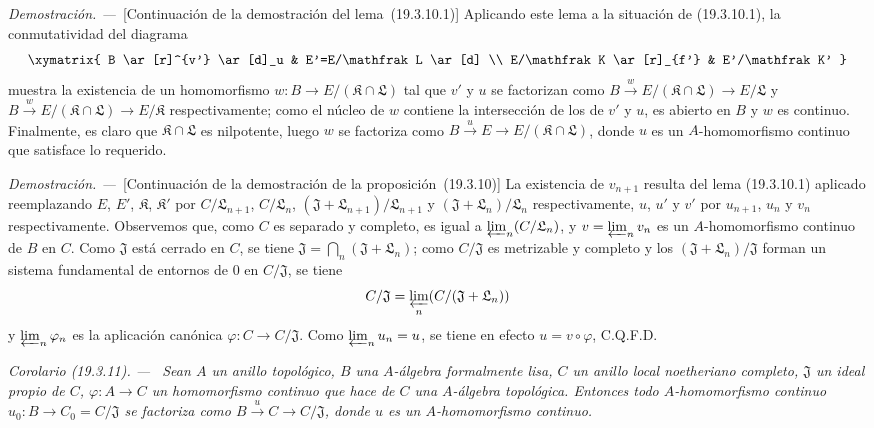 \documentclass[10pt,oneside]{book}
\makeatletter
\newcommand{\setmanualcurrentlabel}[1]{\def\@currentlabel{#1}}
\newenvironment{corollary}[1][]{%
  \setmanualcurrentlabel{#1}\par\medskip\noindent\itshape Corolario (#1). ---\ }{\par}
\newenvironment{proof}{%
  \par\medskip\noindent\textit{Demostración. ---\ }}{\par}
\makeatother
\begin{document}
\begin{proof}[Continuación de la demostración del lema~{\rm(19.3.10.1)}]
Aplicando este lema a la situación de (19.3.10.1), la conmutatividad del
diagrama
\[
\xymatrix{
  B \ar[r]^{v'} \ar[d]_u & E'=E/\mathfrak L \ar[d] \\
  E/\mathfrak K \ar[r]_{f'} & E'/\mathfrak K'
}
\]
muestra la existencia de un homomorfismo
$w:B\to E/(\mathfrak K\cap\mathfrak L)$ tal que $v'$ y $u$ se
factorizan como
$B\xrightarrow{w}E/(\mathfrak K\cap\mathfrak L)\to E/\mathfrak L$
y
$B\xrightarrow{w}E/(\mathfrak K\cap\mathfrak L)\to E/\mathfrak K$
respectivamente; como el núcleo de $w$ contiene la intersección de los de
$v'$ y $u$, es abierto en $B$ y $w$ es continuo. Finalmente, es claro
que $\mathfrak K\cap\mathfrak L$ es nilpotente, luego $w$ se factoriza como
$B\xrightarrow{u}E\to E/(\mathfrak K\cap\mathfrak L)$, donde $u$ es
un $A$-homomorfismo continuo que satisface lo requerido.
\end{proof}

\begin{proof}[Continuación de la demostración de la proposición~{\rm(19.3.10)}]
La existencia de $v_{n+1}$ resulta del lema (19.3.10.1) aplicado reemplazando
$E$, $E'$, $\mathfrak K$, $\mathfrak K'$ por
$C/\mathfrak L_{n+1}$, $C/\mathfrak L_n$,
$(\mathfrak J+\mathfrak L_{n+1})/\mathfrak L_{n+1}$ y
$(\mathfrak J+\mathfrak L_n)/\mathfrak L_n$ respectivamente, $u$, $u'$
y $v'$ por $u_{n+1}$, $u_n$ y $v_n$ respectivamente. Observemos que, como $C$
es separado y completo, es igual a $\varprojlim_n(C/\mathfrak L_n)$, y
$v=\varprojlim_n v_n$ es un $A$-homomorfismo continuo de $B$ en $C$.
Como $\mathfrak J$ está cerrado en $C$, se tiene
$\mathfrak J=\bigcap_n(\mathfrak J+\mathfrak L_n)$; como
$C/\mathfrak J$ es metrizable y completo y los
$(\mathfrak J+\mathfrak L_n)/\mathfrak J$ forman un sistema fundamental
de entornos de $0$ en $C/\mathfrak J$, se tiene
\[
  C/\mathfrak J=\varprojlim_n(C/(\mathfrak J+\mathfrak L_n))
\]
y $\varprojlim_n\varphi_n$ es la aplicación canónica
$\varphi:C\to C/\mathfrak J$. Como $\varprojlim_n u_n=u$, se tiene en efecto
$u=v\circ\varphi$, C.Q.F.D.
\end{proof}

\begin{corollary}[19.3.11]
\label{0.19.3.11-es}
Sean $A$ un anillo topológico, $B$ una $A$-álgebra formalmente lisa,
$C$ un anillo local noetheriano completo, $\mathfrak J$ un ideal propio de
$C$, $\varphi:A\to C$ un homomorfismo continuo que hace de $C$ una
$A$-álgebra topológica. Entonces todo $A$-homomorfismo continuo
$u_0:B\to C_0=C/\mathfrak J$ se factoriza como
$B\xrightarrow{u}C\to C/\mathfrak J$, donde $u$ es un $A$-homomorfismo
continuo.
\end{corollary}
\end{document}
